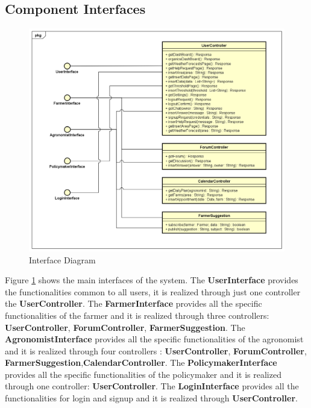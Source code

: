 \newpage

\subsection{Component Interfaces}
\begin{figure}[H]
    \includegraphics[width=\textwidth,height=\textheight,keepaspectratio]{Images/InterfaceDiagram.png}
    \caption{Interface Diagram}
    \label{fig:interface_diagram}
\end{figure}
Figure \ref{fig:interface_diagram} shows the main interfaces of the system.\newline
The \textbf{UserInterface} provides the functionalities common to all users, it is realized through just one controller the \textbf{UserController}. \newline
The \textbf{FarmerInterface} provides all the specific functionalities of the farmer and it is realized through three controllers: \textbf{UserController}, \textbf{ForumController}, \textbf{FarmerSuggestion}.\newline
The \textbf{AgronomistInterface} provides all the specific functionalities of the agronomist and it is realized through four controllers     :
\textbf{UserController}, \textbf{ForumController}, \textbf{FarmerSuggestion},\textbf{CalendarController}.\newline
The \textbf{PolicymakerInterface} provides all the specific functionalities of the policymaker and it is realized through one controller:
\textbf{UserController}.\newline
The \textbf{LoginInterface} provides all the functionalities for login and signup and it is realized through \textbf{UserController}.


